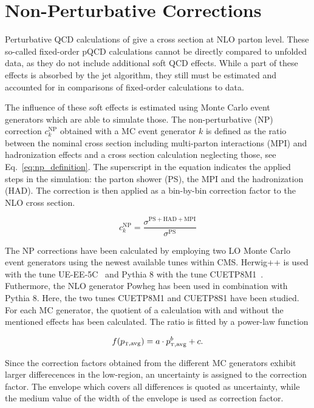 \section{Non-Perturbative Corrections}
\label{sec:np_factors}

Perturbative QCD calculations of \NLOJETPP give a cross section at NLO
parton level. These so-called fixed-order pQCD calculations cannot be directly
compared to unfolded data, as they do not include additional soft QCD
effects. While a part of these effects is absorbed by the jet algorithm,
they still must be estimated and accounted for in comparisons of fixed-order
calculations to data.

The influence of these soft effects is estimated using Monte Carlo event
generators which are able to simulate those. The non-perturbative (NP)
correction $c_k^\mathrm{NP}$ obtained with a MC event generator $k$ is defined
as the ratio between the nominal cross section including multi-parton
interactions (MPI) and hadronization effects and a cross section calculation
neglecting those, see Eq.~\ref{eq:np_definition}. The superscript in the
equation indicates the applied steps in the simulation: the parton shower (PS),
the MPI and the hadronization (HAD). The
correction is then applied as a bin-by-bin correction factor to the NLO cross
section.

\begin{equation*}
    c_{k}^{\mathrm{NP}} = \frac{\sigma^{\mathrm{PS+HAD+MPI}}}{\sigma^{\mathrm{PS}}}
    \label{eq:np_definition}
\end{equation*}

The NP corrections have been calculated by employing two LO Monte Carlo event
generators using the newest available tunes within CMS. Herwig++ is used with
the tune UE-EE-5C~\cite{Seymour:2013qka} and Pythia 8 with the tune
CUETP8M1~\cite{Khachatryan:2015pea}. Futhermore, the NLO generator Powheg has
been used in combination with Pythia 8. Here, the two tunes CUETP8M1 and
CUETP8S1 have been studied. For each MC generator, the quotient of a calculation
with and without the mentioned effects has been calculated. The ratio is fitted
by a power-law function

\begin{equation*}
  f(\ptavg) = a \cdot \ptavg^b + c.
  \label{fcn:np_fit}
\end{equation*}

Since the correction factors obtained from the different MC generators exhibit
larger differecences in the low-\pt region, an uncertainty is assigned to the correction
factor. The envelope which covers all differences is quoted as uncertainty,
while the medium value of the width of the envelope is used as correction
factor.

